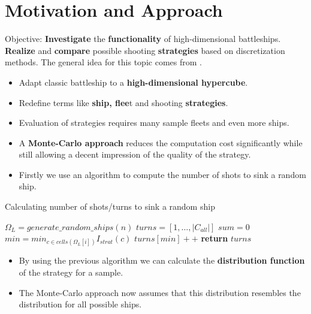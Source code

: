 \documentclass[final,hyperref={pdfpagelabels=false},table]{beamer}
\begin{document}
\begin{frame}
\centering
\begin{columns}[T]
\begin{column}{\colCWidth}


\justifying
\section{Motivation and Approach}
Objective: \textbf{Investigate} the \textbf{functionality} of high-dimensional battleships. \textbf{Realize} and \textbf{compare} possible shooting \textbf{strategies} based on discretization methods. The general idea for this topic comes from \cite{MF}.
\begin{itemize} 
\item Adapt classic battleship to a \textbf{high-dimensional hypercube}.
\item Redefine terms like \textbf{ship, flee}t and shooting \textbf{strategies}.
\item Evaluation of strategies requires many sample fleets and even more ships.
\item A \textbf{Monte-Carlo approach} reduces the computation cost significantly while still allowing a decent impression of the quality of the strategy.
\item Firstly we use an algorithm to compute the number of shots to sink a random ship.
\end{itemize}

\begin{algorithm}[H]
	\caption*{Calculating number of shots/turns to sink a random ship}\label{alg:calcTurns}
	\begin{algorithmic}
		\State $\Omega_L = generate\_random\_ships(n)$  
		\State $turns = [1,\dots,|C_{all}|]$
		\State $sum = 0$
		\State $min = min_{c\in cells(\Omega_L[i])}I_{strat}(c)$
		\State $turns[min]++$
		\EndFor
		\State \textbf{return} $turns$
		\EndProcedure
	\end{algorithmic}
\end{algorithm}

\begin{itemize}
\item By using the previous algorithm we can calculate the \textbf{distribution function} of the strategy for a sample.
\item The Monte-Carlo approach now assumes that this distribution resembles the distribution for all possible ships.
\end{itemize}


\end{column}
\end{columns}
\end{frame}
\end{document}

